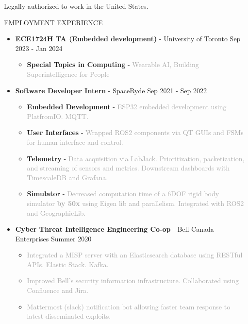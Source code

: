 \documentclass{resume} %
\begin{document}
Legally authorized to work in the United States.

\begin{rSection}{EMPLOYMENT EXPERIENCE}
    \begin{itemize}
        \item {\bf ECE1724H TA (Embedded development)} - University of Toronto \hfill {Sep 2023 - Jan 2024}
        \begin{itemize}[topsep=-10pt]
            \setlength\itemsep{-0.5em}
                \item[\textbullet] {\bf Special Topics in Computing} - \textcolor{darkgray}{Wearable AI, Building Superintelligence for People}
            \end{itemize}
        \item {\bf Software Developer Intern} - SpaceRyde \hfill {Sep 2021 - Sep 2022}
        \begin{itemize}[topsep=-10pt]
            \setlength\itemsep{-0.5em}
            \item[\textbullet] {\bf Embedded Development} - \textcolor{darkgray}{ESP32 embedded development using PlatfromIO. MQTT.}
            \item[\textbullet] {\bf User Interfaces} - \textcolor{darkgray}{Wrapped ROS2 components via QT GUIs and FSMs for human interface and control.}
            \item[\textbullet] {\bf Telemetry} - \textcolor{darkgray}{Data acquisition via LabJack. Prioritization, packetization, and streaming of sensors and metrics. Downstream dashboards with TimescaleDB and Grafana.}
            \item[\textbullet] {\bf Simulator} - \textcolor{darkgray}{Decreased computation time of a 6DOF rigid body simulator \textbf{by 50x} using Eigen lib and parallelism.
            Integrated with ROS2 and GeographicLib.}
        \end{itemize}
        \item {\bf Cyber Threat Intelligence Engineering Co-op} - Bell Canada Enterprises \hfill {Summer 2020}
        \begin{itemize}[topsep=-10pt]
            \setlength\itemsep{-0.5em}
            \item[\textbullet] \textcolor{darkgray}{Integrated a MISP server with an Elasticsearch database using RESTful APIs. Elastic Stack. Kafka.}
            \item[\textbullet] \textcolor{darkgray}{Improved Bell's security information infrastructure. Collaborated using Confluence and Jira.}
            \item[\textbullet] \textcolor{darkgray}{Mattermost (slack) notification bot allowing faster team response to latest disseminated exploits.}
        \end{itemize}
    \end{itemize}
\end{rSection}
\end{document}
